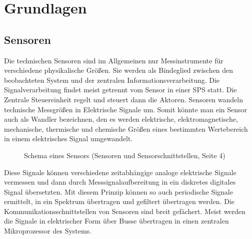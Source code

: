 \documentclass[a4paper,12pt]{scrartcl}
\begin{document}
\section{Grundlagen}

\subsection{Sensoren}
Die technischen Sensoren sind im Allgemeinen nur Messinstrumente für verschiedene physikalische Größen. Sie werden als Bindeglied zwischen den beobachteten System und der zentralen Informationsverarbeitung. Die Signalverarbeitung findet meist getrennt vom Sensor in einer SPS statt. Die Zentrale Steuereinheit regelt und steuert dann die Aktoren.
Sensoren wandeln technische Messgrößen in Elektrische Signale um. Somit könnte man ein Sensor auch als Wandler bezeichnen, den es werden elektrische, elektromagnetische, mechanische, thermische und chemische Größen eines bestimmten Wertebereich in einem elektrisches Signal umgewandelt. \cite[Seite 4]{Huning.2016} %
\vspace{0.5cm}
\begin{figure}[H]
\centering 
{}
  \caption{Schema eines Sensors (Sensoren und Sensorschnittstellen, Seite 4)}
 \label{fig:Schema eines Sensors} 
\end{figure}

Diese Signale können verschiedene zeitabhängige analoge elektrische Signale vermessen und dann durch Messsignalaufbereitung in ein diskretes digitales Signal übersetzten. Mit diesem Prinzip können so auch periodische Signale ermittelt, in ein Spektrum übertragen und gefiltert übertragen werden. Die Kommunikationsschnittstellen von Sensoren sind breit gefächert. Meist werden die Signale in elektrischer Form über Busse übertragen in einen zentralen Mikroprozessor des Systems. \cite[Seite 9]{Huning.2016}
\vspace{0.5cm}
\end{document}

